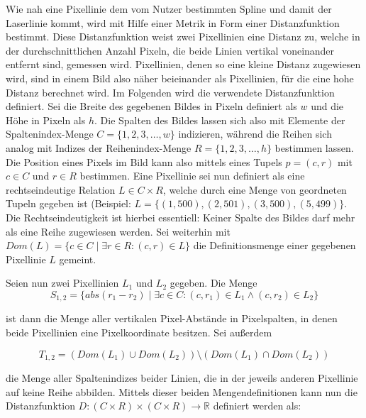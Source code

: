 Wie nah eine Pixellinie dem vom Nutzer bestimmten Spline und damit der Laserlinie kommt, wird mit Hilfe einer Metrik in Form einer Distanzfunktion bestimmt. Diese Distanzfunktion weist zwei Pixellinien eine Distanz zu, welche in der durchschnittlichen Anzahl Pixeln, die beide Linien vertikal voneinander entfernt sind, gemessen wird. Pixellinien, denen so eine kleine Distanz zugewiesen wird, sind in einem Bild also näher beieinander als Pixellinien, für die eine hohe Distanz berechnet wird. Im Folgenden wird die verwendete Distanzfunktion definiert.\newline
Sei die Breite des gegebenen Bildes in Pixeln definiert als \(w\) und die Höhe in Pixeln als \(h\). Die Spalten des Bildes  lassen sich also mit Elemente der Spaltenindex-Menge \(C = \lbrace 1, 2, 3, \ldots , w \rbrace\) indizieren, während  die Reihen sich analog mit Indizes der Reihenindex-Menge \(R = \lbrace 1, 2, 3, \ldots , h \rbrace\) bestimmen lassen. Die Position eines Pixels im Bild kann also mittels eines Tupels \(p = (c, r)\) mit \(c \in C\) und \(r \in R\) bestimmen. Eine Pixellinie sei nun definiert als eine rechtseindeutige Relation \(L \in C \times R\), welche durch eine Menge von geordneten Tupeln gegeben ist (Beispiel: \(L = \lbrace (1, 500), (2,501), (3, 500), (5, 499) \rbrace\).
Die Rechtseindeutigkeit ist hierbei essentiell: Keiner Spalte des Bildes darf mehr als eine Reihe zugewiesen werden. Sei weiterhin mit \(Dom(L) = \lbrace c \in C \mid \exists r \in R: (c,r) \in L \rbrace\) die Definitionsmenge einer gegebenen Pixellinie \(L\) gemeint.\newline

Seien nun zwei Pixellinien \(L_{1}\) und \(L_{2}\) gegeben. Die Menge
\begin{equation}
\label{equ:DefS}
S_{1,2} = \lbrace abs(r_{1} - r_{2}) \mid \exists c \in C: (c, r_{1}) \in L_{1} \wedge (c, r_{2}) \in L_{2} \rbrace
\end{equation}

ist dann die Menge aller vertikalen Pixel-Abstände in Pixelspalten, in denen beide Pixellinien eine Pixelkoordinate besitzen. Sei außerdem

\begin{equation}
\label{equ:DefT}
T_{1,2} = (Dom(L_{1}) \cup Dom(L_{2})) \setminus (Dom(L_{1}) \cap Dom(L_{2}))   
\end{equation}   

die Menge aller Spaltenindizes beider Linien, die in der jeweils anderen Pixellinie auf keine Reihe abbilden. Mittels dieser beiden Mengendefinitionen kann nun die Distanzfunktion \(D: (C \times R) \times (C \times R) \rightarrow \mathbb{R}\) definiert werden als:

